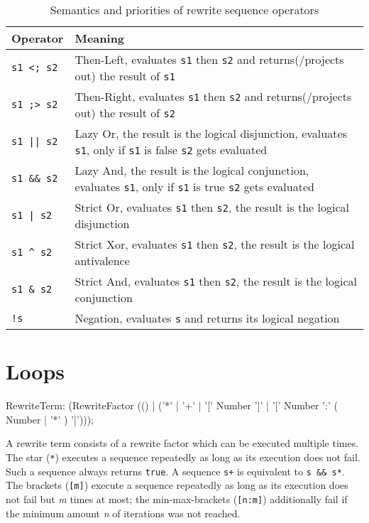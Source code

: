 \begin{table}[htbp]
    \begin{tabularx}{\linewidth}{l|X}
        \bf Operator & \bf Meaning \\\hline\hline
        \verb/s1 <; s2/ & Then-Left, evaluates \texttt{s1} then \texttt{s2} and returns(/projects out) the result of \texttt{s1}\\
		\verb/s1 ;> s2/ & Then-Right, evaluates \texttt{s1} then \texttt{s2} and returns(/projects out) the result of \texttt{s2}\\\hline
        \verb/s1 || s2/ & Lazy Or, the result is the logical disjunction, evaluates \texttt{s1}, only if \texttt{s1} is false \texttt{s2} gets evaluated\\\hline
        \verb/s1 && s2/ & Lazy And, the result is the logical conjunction, evaluates \texttt{s1}, only if \texttt{s1} is true \texttt{s2} gets evaluated\\\hline
        \verb/s1 | s2/ & Strict Or, evaluates \texttt{s1} then \texttt{s2}, the result is the logical disjunction\\\hline
        \verb/s1 ^ s2/ & Strict Xor, evaluates \texttt{s1} then \texttt{s2}, the result is the logical antivalence\\\hline
        \verb/s1 & s2/ & Strict And, evaluates \texttt{s1} then \texttt{s2}, the result is the logical conjunction\\\hline
        \verb/!s/ & Negation, evaluates \texttt{s} and returns its logical negation\\\hline
	\end{tabularx}    
    \caption{Semantics and priorities of rewrite sequence operators}
    \label{tbl:sequ:op}
\end{table}


\section{Loops}

\begin{rail}
  RewriteTerm: 
    (RewriteFactor (() | ('*' | '+' | '[' Number ']' | '[' Number ':' ( Number | '*' ) ']')));
\end{rail}

A rewrite term consists of a rewrite factor which can be executed multiple times.
The star (\texttt{*}) executes a sequence repeatedly as long as its execution does not fail. 
Such a sequence always returns \texttt{true}.
A sequence \verb#s+# is equivalent to \verb#s && s*#.
The brackets (\texttt{[m]}) execute a sequence repeatedly as long as its execution does not fail but \emph{m} times at most;
the min-max-brackets (\texttt{[n:m]}) additionally fail if the minimum amount \emph{n} of iterations was not reached.

